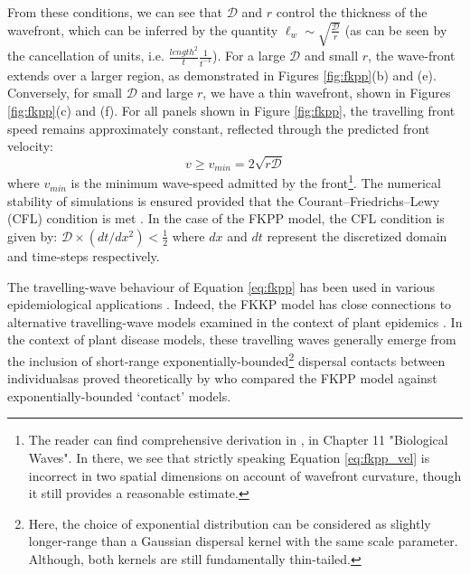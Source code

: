 From these conditions, we can see that $\mathcal{D}$ and $r$ control the thickness of the wavefront,
which can be inferred by the quantity  $\ell_{w} \sim \sqrt{ \frac{\mathcal{D}}{r}}$ 
(as can be seen by the cancellation of units, i.e. $\frac{length^2}{t} \frac{1}{t^{-1}}$).
For a large $\mathcal{D}$ and small $r$, the wave-front extends over a larger region, as 
demonstrated in Figures \ref{fig:fkpp}(b) and (e). Conversely, for
small $\mathcal{D}$ and large $r$, we have a thin wavefront, shown in Figures \ref{fig:fkpp}(c) and (f).
For all panels shown in Figure \ref{fig:fkpp}, the travelling front speed remains
approximately constant, reflected through the predicted front velocity:
\begin{equation}
    \label{eq:fkpp_vel}
    v \geq v_{min} = 2\sqrt{r\mathcal{D}}
\end{equation}
where $v_{min}$ is the minimum wave-speed admitted by the front\footnote{
The reader can find comprehensive derivation in \cite{murray2002mathematicalbiology}, 
in Chapter 11 "Biological Waves". In there, we see that strictly speaking Equation \ref{eq:fkpp_vel} 
is incorrect in two spatial dimensions on account of wavefront curvature, though it still provides
a reasonable estimate.}.
The numerical stability of simulations is ensured provided that the Courant–Friedrichs–Lewy (CFL) condition
is met \cite{cfl-condition}.
In the case of the FKPP model, the CFL condition is given by: $\mathcal{D} \times (dt/dx^2 )< \frac{1}{2}$
where $dx$ and $dt$ represent the discretized domain and time-steps respectively.

The travelling-wave behaviour of Equation \ref{eq:fkpp} has been used in various epidemiological applications
\cite{britton1986reaction, murray2002mathematicalbiology, klein2010reaction,bianco2013reaction, yano2017kinetic}.
Indeed, the FKKP model has close connections to alternative travelling-wave models examined in the context of
plant epidemics \cite{heesterbeek1987modelling, van1988focus}. In the context of plant disease models, 
these travelling waves generally emerge from the inclusion of short-range exponentially-bounded\footnote{
Here, the choice of exponential distribution can be considered as slightly longer-range than a Gaussian dispersal kernel 
with the same scale parameter. Although, both kernels are still fundamentally thin-tailed.} dispersal contacts
between individuals\textemdash as proved theoretically by \cite{mollison1977spatial} who compared the FKPP model against 
exponentially-bounded `contact' models.

